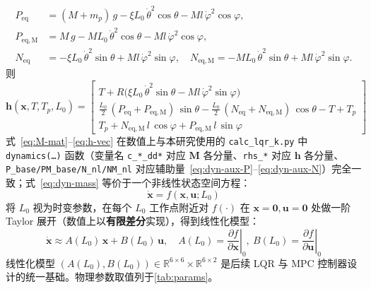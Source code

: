 \documentclass{smbuthesis}
\begin{document}
\begin{align}
\label{eq:dyn-aux-P}
P_\mathrm{eq}   &= (M+m_p)\,g - \xi L_0\,\dot\theta^2\cos\theta - M l\,\dot\varphi^2\cos\varphi,\\
\label{eq:dyn-aux-PM}
P_\mathrm{eq,M} &= M\,g - M L_0\,\dot\theta^2\cos\theta - M l\,\dot\varphi^2\cos\varphi,\\
\label{eq:dyn-aux-N}
N_\mathrm{eq}   &= -\xi L_0\,\dot\theta^2\sin\theta + M l\,\dot\varphi^2\sin\varphi,\quad
N_\mathrm{eq,M} = -M L_0\,\dot\theta^2\sin\theta + M l\,\dot\varphi^2\sin\varphi.
\end{align}
则
\begin{equation}
\label{eq:h-vec}
\mathbf{h}(\mathbf{x}, T, T_p, L_0) =
\begin{bmatrix}
T + R\bigl(\xi L_0\,\dot\theta^2 \sin\theta - M l\,\dot\varphi^2 \sin\varphi\bigr) \\[2pt]
\tfrac{L_0}{2}\,(P_\mathrm{eq} + P_\mathrm{eq,M})\,\sin\theta - \tfrac{L_0}{2}\,(N_\mathrm{eq} + N_\mathrm{eq,M})\,\cos\theta - T + T_p \\[2pt]
T_p + N_\mathrm{eq,M}\,l\,\cos\varphi + P_\mathrm{eq,M}\,l\,\sin\varphi
\end{bmatrix}
\end{equation}
式~\eqref{eq:M-mat}--\eqref{eq:h-vec} 在数值上与本研究使用的 \texttt{calc\_lqr\_k.py} 中 \texttt{dynamics(\ldots)} 函数（变量名 \texttt{c\_*\_dd*} 对应 $\mathbf{M}$ 各分量、\texttt{rhs\_*} 对应 $\mathbf{h}$ 各分量、\texttt{P\_base/PM\_base/N\_nl/NM\_nl} 对应辅助量~\eqref{eq:dyn-aux-P}--\eqref{eq:dyn-aux-N}）完全一致；式~\eqref{eq:dyn-mass} 等价于一个非线性状态空间方程：
\begin{equation}
\label{eq:dyn-ss}
\dot{\mathbf{x}} = f(\mathbf{x}, \mathbf{u}; L_0)
\end{equation}
将 $L_0$ 视为时变参数，在每个 $L_0$ 工作点附近对 $f(\cdot)$ 在 $\mathbf{x} = \mathbf{0}, \mathbf{u} = \mathbf{0}$ 处做一阶 Taylor 展开（数值上以\textbf{有限差分}实现），得到线性化模型：
\begin{equation}
\label{eq:linearization}
\dot{\mathbf{x}} \approx A(L_0)\,\mathbf{x} + B(L_0)\,\mathbf{u},\quad
A(L_0) = \left.\frac{\partial f}{\partial \mathbf{x}}\right|_{0},\
B(L_0) = \left.\frac{\partial f}{\partial \mathbf{u}}\right|_{0}
\end{equation}
线性化模型 $(A(L_0), B(L_0)) \in \mathbb{R}^{6\times 6} \times \mathbb{R}^{6\times 2}$ 是后续 LQR 与 MPC 控制器设计的统一基础。物理参数取值列于\cref{tab:params}。
\end{document}
